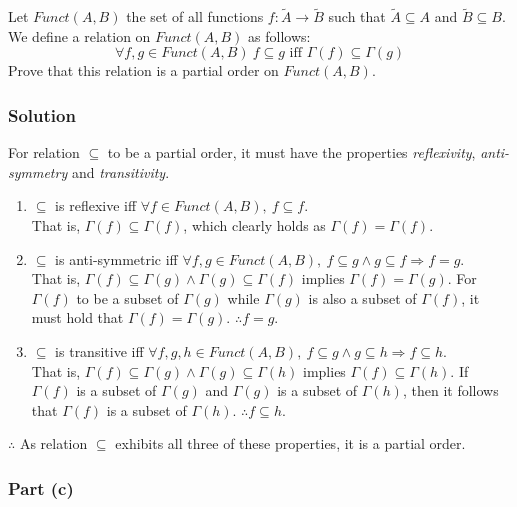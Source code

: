 \documentclass[12pt]{article}
\begin{document}
Let $Funct(A, B)$ the set of all functions $f : \tilde{A} \rightarrow \tilde{B}$ such that $\tilde{A} \subseteq A$ and $\tilde{B} \subseteq B$. We define a relation on $Funct(A, B)$ as follows:
\[
	\forall f,g \in Funct(A, B)\ f \subseteq g \text{ iff } \Gamma(f) \subseteq \Gamma(g)
\]
Prove that this relation is a partial order on $Funct(A, B)$.

\subsubsection*{Solution}

For relation $\subseteq$ to be a partial order, it must have the properties \textit{reflexivity}, \textit{anti-symmetry} and \textit{transitivity}.
\begin{enumerate}[label = \textbf{(\roman*)}]
	\item
		$\subseteq$ is reflexive iff $\forall f \in Funct(A,B),\ f \subseteq f$.\\
		That is, $\Gamma(f) \subseteq \Gamma(f)$, which clearly holds as $\Gamma(f) = \Gamma(f)$.

	\item
		$\subseteq$ is anti-symmetric iff $\forall f,g \in Funct(A,B),\ f \subseteq g \land g \subseteq f \Rightarrow f = g$.\\
		That is, $\Gamma(f) \subseteq \Gamma(g) \land \Gamma(g) \subseteq \Gamma(f)$ implies $\Gamma(f) = \Gamma(g)$.
		For $\Gamma(f)$ to be a subset of $\Gamma(g)$ while $\Gamma(g)$ is also a subset of $\Gamma(f)$, it must hold that $\Gamma(f) = \Gamma(g)$.
		$\therefore f = g$.

	\item
		$\subseteq$ is transitive iff $\forall f,g,h \in Funct(A,B),\ f \subseteq g \land g \subseteq h \Rightarrow f \subseteq h$.\\
		That is, $\Gamma(f) \subseteq \Gamma(g) \land \Gamma(g) \subseteq \Gamma(h)$ implies $\Gamma(f) \subseteq \Gamma(h)$.
		If $\Gamma(f)$ is a subset of $\Gamma(g)$ and $\Gamma(g)$ is a subset of $\Gamma(h)$, then it follows that $\Gamma(f)$ is a subset of $\Gamma(h)$.
		$\therefore f \subseteq h$.

\end{enumerate}
$\therefore$ As relation $\subseteq$ exhibits all three of these properties, it is a partial order.

\subsubsection*{Part (c)}
\end{document}
